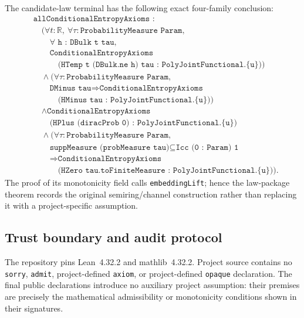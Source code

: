 The candidate-law terminal has the following exact four-family conclusion:
{\small
\[
\begin{aligned}
&\texttt{allConditionalEntropyAxioms :}\\
&\quad
 \bigl(\forall t:\mathbb R,\ \forall\tau:\texttt{ProbabilityMeasure Param},\\
&\qquad \forall\texttt{ h : DBulk t tau},\\
&\qquad \texttt{ConditionalEntropyAxioms}\\
&\qquad\quad \texttt{(HTemp t (DBulk.ne h) tau : PolyJointFunctional.\{u\})}\bigr)\\
&\quad\land
 \bigl(\forall\tau:\texttt{ProbabilityMeasure Param},\\
&\qquad \texttt{DMinus tau} \Longrightarrow \texttt{ConditionalEntropyAxioms}\\
&\qquad\quad \texttt{(HMinus tau : PolyJointFunctional.\{u\})}\bigr)\\
&\quad\land
 \texttt{ConditionalEntropyAxioms}\\
&\qquad \texttt{(HPlus (diracProb 0) : PolyJointFunctional.\{u\})}\\
&\quad\land
 \bigl(\forall\tau:\texttt{ProbabilityMeasure Param},\\
&\qquad \texttt{suppMeasure (probMeasure tau)}
      \subseteq\texttt{Icc (0 : Param) 1}\\
&\qquad \Longrightarrow \texttt{ConditionalEntropyAxioms}\\
&\qquad\quad \texttt{(HZero tau.toFiniteMeasure : PolyJointFunctional.\{u\})}\bigr).
\end{aligned}
\]
}
The proof of its monotonicity field calls \texttt{embeddingLift}; hence the
law-package theorem records the original semiring/channel construction rather
than replacing it with a project-specific assumption.

\subsection{Trust boundary and audit protocol}
\label{app:lean-audit}

The repository pins Lean~4.32.2 and mathlib~4.32.2.  Project source contains
no \texttt{sorry}, \texttt{admit}, project-defined
\texttt{axiom}, or project-defined \texttt{opaque} declaration.  The final
public declarations introduce no auxiliary project assumption: their premises
are precisely the mathematical admissibility or monotonicity conditions shown
in their signatures.

